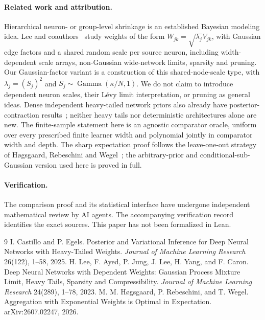 \documentclass[11pt]{article}
\theoremstyle{remark}\newtheorem{remark}[theorem]{Remark}
\begin{document}
\paragraph{Related work and attribution.}
Hierarchical neuron- or group-level shrinkage is an established Bayesian modeling idea. Lee and coauthors~\cite{lee-dependent} study weights of the form $W_{jk}=\sqrt{\lambda_j}V_{jk}$, with Gaussian edge factors and a shared random scale per source neuron, including width-dependent scale arrays, non-Gaussian wide-network limits, sparsity and pruning. Our Gaussian-factor variant is a construction of this shared-node-scale type, with $\lambda_j=(S_j)^2$ and $S_j\sim\operatorname{Gamma}(\kappa/N,1)$. We do not claim to introduce dependent neuron scales, their L\'evy limit interpretation, or pruning as general ideas. Dense independent heavy-tailed network priors also already have posterior-contraction results~\cite{castillo-egels}; neither heavy tails nor deterministic architectures alone are new. The finite-sample statement here is an agnostic comparator oracle, uniform over every prescribed finite learner width and polynomial jointly in comparator width and depth. The sharp expectation proof follows the leave-one-out strategy of H\o gsgaard, Rebeschini and Wegel~\cite{hogsgaard}; the arbitrary-prior and conditional-sub-Gaussian version used here is proved in full.

\paragraph{Verification.}
The comparison proof and its statistical interface have undergone independent mathematical review by AI agents. The accompanying verification record identifies the exact sources. This paper has not been formalized in Lean.
\begin{thebibliography}{9}
 I. Castillo and P. Egels. Posterior and Variational Inference for Deep Neural Networks with Heavy-Tailed Weights. \emph{Journal of Machine Learning Research} 26(122), 1--58, 2025.
 H. Lee, F. Ayed, P. Jung, J. Lee, H. Yang, and F. Caron. Deep Neural Networks with Dependent Weights: Gaussian Process Mixture Limit, Heavy Tails, Sparsity and Compressibility. \emph{Journal of Machine Learning Research} 24(289), 1--78, 2023.
 M. M. H\o gsgaard, P. Rebeschini, and T. Wegel. Aggregation with Exponential Weights is Optimal in Expectation. arXiv:2607.02247, 2026.
\end{thebibliography}
\end{document}
